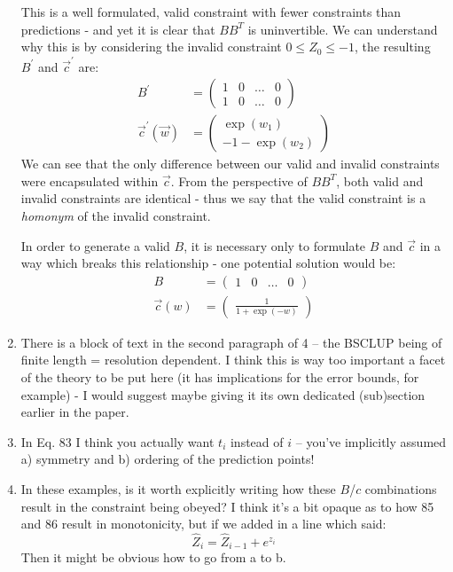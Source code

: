 \documentclass[]{article}
\begin{document}
\begin{enumerate}
	This is a well formulated, valid constraint with fewer constraints than predictions - and yet it is clear that $BB^T$ is uninvertible. We can understand why this is by considering the invalid constraint $0 \leq Z_0 \leq -1$, the resulting $B^\prime$ and $\vec{c}^\prime$ are:
	\begin{align}
			B^\prime &= \begin{pmatrix}
				1 & 0 & \hdots & 0
				\\
				1 & 0 & \hdots & 0
			\end{pmatrix}
			\\
			\vec{c}^\prime(\vec{w})& = \begin{pmatrix}
				\exp(w_1)
				\\
				-1 - \exp(w_2)
			\end{pmatrix}
	\end{align}
	We can see that the only difference between our valid and invalid constraints were encapsulated within $\vec{c}$. From the perspective of $BB^T$, both valid and invalid constraints are identical - thus we say that the valid constraint is a \textit{homonym} of the invalid constraint. 

	In order to generate a valid $B$, it is necessary only to formulate $B$ and $\vec{c}$ in a way which breaks this relationship - one potential solution would be:
	\begin{align}
		B & = \begin{pmatrix}
			1 & 0 & \hdots & 0
		\end{pmatrix}
		\\
		\vec{c}(w) & = \begin{pmatrix}
			\frac{1}{1 + \exp(-w)}
		\end{pmatrix}
	\end{align}

	\item There is a block of text in the second paragraph of 4 -- the BSCLUP being of finite length = resolution dependent. I think this is way too important a facet of the theory to be put here (it has implications for the error bounds, for example) - I would suggest maybe giving it its own dedicated (sub)section earlier in the paper.
	\item In Eq. 83 I think you actually want $t_i$ instead of $i$ -- you've implicitly assumed a) symmetry and b) ordering of the prediction points!
	\item In these examples, is it worth explicitly writing how these $B$/$c$ combinations result in the constraint being obeyed? I think it's a bit opaque as to how 85 and 86 result in monotonicity, but if we added in a line which said:
	\begin{equation}
		\hat{Z}_i = \hat{Z}_{i-1} + e^{z_i}
	\end{equation}
	Then it might be obvious how to go from a to b.

\end{enumerate}
\end{document}

